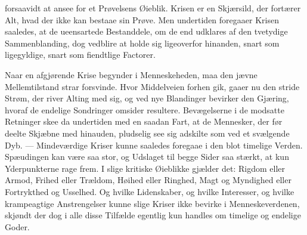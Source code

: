 \documentclass[12pt,a4paper]{book}
\begin{document}
forsaavidt at ansee for et Prøvelsens Øieblik. Krisen er en Skjærsild, der fortærer
Alt, hvad der ikke kan bestaae sin Prøve. Men undertiden foregaaer Krisen saaledes, at
de ueensartede Bestanddele, om de end udklares af den tvetydige Sammenblanding, dog
vedblire at holde sig ligeoverfor hinanden, snart som ligegyldige, snart som fiendtlige
Factorer.

Naar en afgjørende Krise begynder i Menneskeheden, maa den jævne Mellemtilstand strar
forsvinde. Hvor Middelveien forhen gik, gaaer nu den stride Strøm, der river Alting med
sig, og ved nye Blandinger bevirker den Gjæring, hvoraf de endelige Sondringer omsider
resultere. Bevægelserne i de modsatte Retninger skee da undertiden med en saadan Fart,
at de Mennesker, der før deelte Skjæbne med hinauden, pludselig see sig adskilte som
ved et svælgende Dyb. --- Mindeværdige Kriser kunne saaledes foregaae i den blot
timelige Verden. Spæudingen kan være saa stor, og Udslaget til begge Sider saa stærkt,
at kun Yderpunkterne rage frem. I slige kritiske Øieblikke gjælder det: Rigdom eller
Armod, Frihed eller Trældom, Høihed eller Ringhed, Magt og Myndighed eller Fortrykthed
og Usselhed. Og hvilke Lidenskaber, og hvilke Interesser, og hvilke krampeagtige
Anstrengelser kunne slige Kriser ikke bevirke i Menneskeverdenen, skjøndt der dog i
alle disse Tilfælde egentlig kun handles om timelige og endelige Goder.
\end{document}
